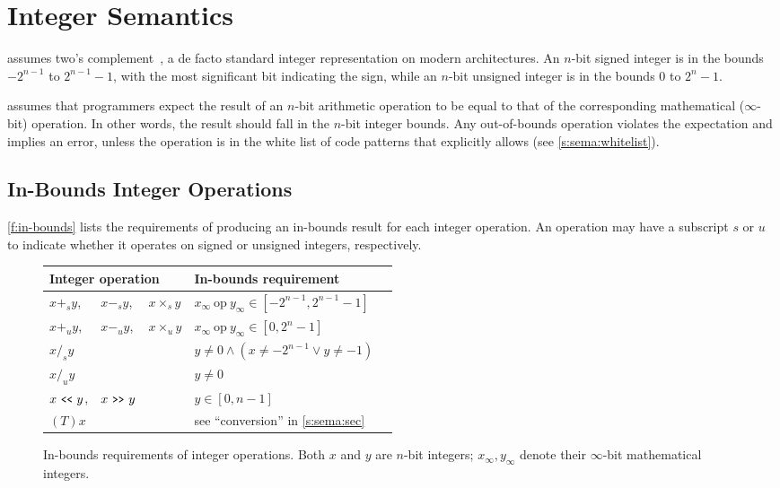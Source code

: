 \section{Integer Semantics}
\label{s:sema}

\sys assumes two's complement~\cite[\subsectionautorefname~4.2.1]{intel:vol1},
a de facto standard integer representation on modern architectures.
An $n$-bit signed integer is in the bounds $-2^{n-1}$ to $2^{n-1}-1$,
with the most significant bit indicating the sign,
while an $n$-bit unsigned integer is in the bounds $0$ to $2^n-1$.

\sys assumes that programmers expect the result of an $n$-bit
arithmetic operation to be equal to that of the corresponding mathematical
($\infty$-bit) operation.
In other words, the result should fall in the $n$-bit integer bounds.
%
Any out-of-bounds operation violates the expectation and implies an
error, unless the operation is in the white list of code patterns
that \sys explicitly allows (see \autoref{s:sema:whitelist}).

\subsection{In-Bounds Integer Operations}
\label{s:sema:sec}

\autoref{f:in-bounds} lists the requirements of producing an in-bounds result
for each integer operation.
%
An operation may have a subscript $s$ or $u$ to indicate whether
it operates on signed or unsigned integers, respectively.

\begin{figure}
\small
\centering
\begin{tabular}{l@{ }l@{ }lll}\toprule
\multicolumn{3}{l}{Integer operation} & In-bounds requirement \\
\midrule
$x +_s y$, & $x -_s y$, & $x \times_s y$
& $x_{\infty}\ \textrm{op}\ y_{\infty} \in [-2^{n-1}, 2^{n-1}-1]$
\\
$x +_u y$, & $x -_u y$, & $x \times_u y$
& $x_{\infty}\ \textrm{op}\ y_{\infty} \in [0, 2^n-1]$
\\
$x /_s y$ & &
& $y \neq 0 \land (x \neq -2^{n-1} \lor y \neq -1) $
\\
$x /_u y$ & &
& $y \neq 0$
\\
$ x \shl y$, & $x \shr y$ &
& $y \in [0, n-1]$
\\
$(T)x$ & &
& see ``conversion'' in \autoref{s:sema:sec}
\\
\bottomrule
\end{tabular}
\caption{In-bounds requirements of integer operations.
Both $x$ and $y$ are $n$-bit integers; $x_{\infty}, y_{\infty}$
denote their $\infty$-bit mathematical integers.}
\label{f:in-bounds}
\end{figure}

